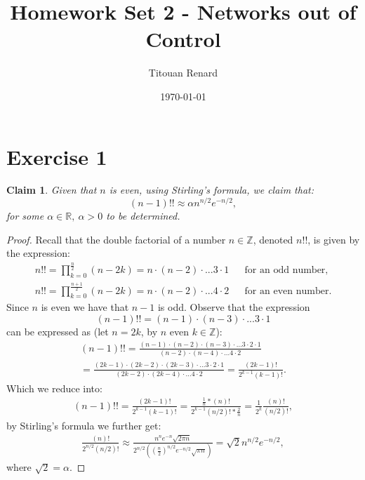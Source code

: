 \documentclass[11pt]{article}
\title{Homework Set 2 - Networks out of Control}
\date{\today}
\author{Titouan Renard}
\newtheorem{claim}{Claim}
\begin{document}
\maketitle	

\section*{Exercise 1}


\begin{claim}
    Given that $n$ is even, using Stirling's formula, we claim that:
    \[ (n-1)!! \approx \alpha n^{n/2}e^{-n/2}, \]
    for some $\alpha \in \mathbb{R},~\alpha>0$ to be determined.
\end{claim}

\begin{proof}
    Recall that the double factorial of a number $n \in \mathbb{Z}$, denoted $n!!$, is given by the expression: 
    \begin{align*}
        n!! = \prod_{k=0}^{\frac{n}{2}} (n-2k) = n \cdot (n-2)  \cdot ... 3 \cdot 1 && \text{for an odd number,} \\
        n!! = \prod_{k=0}^{\frac{n+1}{2}} (n-2k) = n \cdot (n-2)  \cdot ... 4 \cdot 2 && \text{for an even number.} 
    \end{align*}
    Since $n$ is even we have that $n-1$ is odd. Observe that the expression
    \[ (n-1)!! = (n-1) \cdot (n-3)  \cdot ... 3 \cdot 1 \]
    can be expressed as (let $n=2k$, by $n$ even $k\in\mathbb{Z}$): 
    \begin{align*}
        (n-1)!! = \frac{(n-1) \cdot (n-2) \cdot (n-3) \cdot ... 3 \cdot 2 \cdot 1}{(n-2) \cdot (n-4) \cdot ... 4 \cdot 2} \\
        = \frac{(2k-1) \cdot (2k-2) \cdot (2k-3) \cdot ... 3 \cdot 2 \cdot 1}{(2k-2) \cdot (2k-4) \cdot ... 4 \cdot 2} = \frac{(2k-1)!}{2^{k-1}(k-1)!}.
    \end{align*}
    Which we reduce into:
    \begin{align*}
        (n-1)!! =  \frac{(2k-1)!}{2^{k-1}(k-1)!} = \frac{\frac{1}{n}*(n)!}{2^{k-1}(n/2)!*\frac{2}{n}} = \frac{1}{2^k} \frac{(n)!}{(n/2)!},
    \end{align*}
    by Stirling's formula we further get:
    \begin{align*}
        \frac{(n)!}{2^{n/2}(n/2)!} \approx  \frac{n^{n} e^{-n} \sqrt{2 \pi n}}{2^{n/2}((\frac{n}{2})^{n/2} e^{-n/2} \sqrt{\pi n})} = \sqrt{2}n^{n/2}e^{-n/2},
    \end{align*}
    where $\sqrt{2} = \alpha$.
\end{proof}
\end{document}
